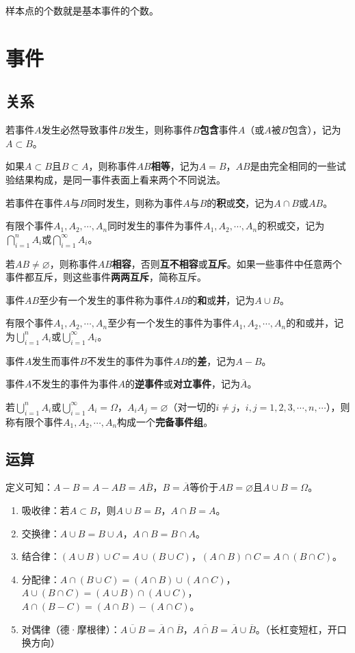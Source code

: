\documentclass[UTF8, 12pt]{ctexart}
\begin{document}
样本点的个数就是基本事件的个数。

\section{事件}

\subsection{关系}

若事件$A$发生必然导致事件$B$发生，则称事件$B$\textbf{包含}事件$A$（或$A$被$B$包含），记为$A\subset B$。

如果$A\subset B$且$B\subset A$，则称事件$AB$\textbf{相等}，记为$A=B$，$AB$是由完全相同的一些试验结果构成，是同一事件表面上看来两个不同说法。

若事件在事件$A$与$B$同时发生，则称为事件$A$与$B$的\textbf{积}或\textbf{交}，记为$A\cap B$或$AB$。

有限个事件$A_1,A_2,\cdots,A_n$同时发生的事件为事件$A_1,A_2,\cdots,A_n$的积或交，记为$\bigcap\limits_{i=1}^nA_i$或$\bigcap\limits_{i=1}^\infty A_i$。

若$AB\neq\varnothing$，则称事件$AB$\textbf{相容}，否则\textbf{互不相容}或\textbf{互斥}。如果一些事件中任意两个事件都互斥，则这些事件\textbf{两两互斥}，简称互斥。

事件$AB$至少有一个发生的事件称为事件$AB$的\textbf{和}或\textbf{并}，记为$A\cup B$。

有限个事件$A_1,A_2,\cdots,A_n$至少有一个发生的事件为事件$A_1,A_2,\cdots,A_n$的和或并，记为$\bigcup\limits_{i=1}^nA_i$或$\bigcup\limits_{i=1}^\infty A_i$。

事件$A$发生而事件$B$不发生的事件为事件$AB$的\textbf{差}，记为$A-B$。

事件$A$不发生的事件为事件$A$的\textbf{逆事件}或\textbf{对立事件}，记为$\overline{A}$。

若$\bigcup\limits_{i=1}^nA_i$或$\bigcup\limits_{i=1}^\infty A_i=\Omega$，$A_iA_j=\varnothing$（对一切的$i\neq j$，$i,j=1,2,3,\cdots,n,\cdots$），则称有限个事件$A_1,A_2,\cdots,A_n$构成一个\textbf{完备事件组}。

\subsection{运算}

定义可知：$A-B=A-AB=A\overline{B}$，$B=\overline{A}$等价于$AB=\varnothing$且$A\cup B=\Omega$。

\begin{enumerate}
    \item 吸收律：若$A\subset B$，则$A\cup B=B$，$A\cap B=A$。
    \item 交换律：$A\cup B=B\cup A$，$A\cap B=B\cap A$。
    \item 结合律：$(A\cup B)\cup C=A\cup(B\cup C)$，$(A\cap B)\cap C=A\cap(B\cap C)$。
    \item 分配律：$A\cap(B\cup C)=(A\cap B)\cup(A\cap C)$，$A\cup(B\cap C)=(A\cup B)\cap(A\cup C)$，$A\cap(B-C)=(A\cap B)-(A\cap C)$。
    \item 对偶律（德·摩根律）：$\overline{A\cup B}=\overline{A}\cap\overline{B}$，$\overline{A\cap B}=\overline{A}\cup\overline{B}$。（长杠变短杠，开口换方向）
\end{enumerate}
\end{document}
